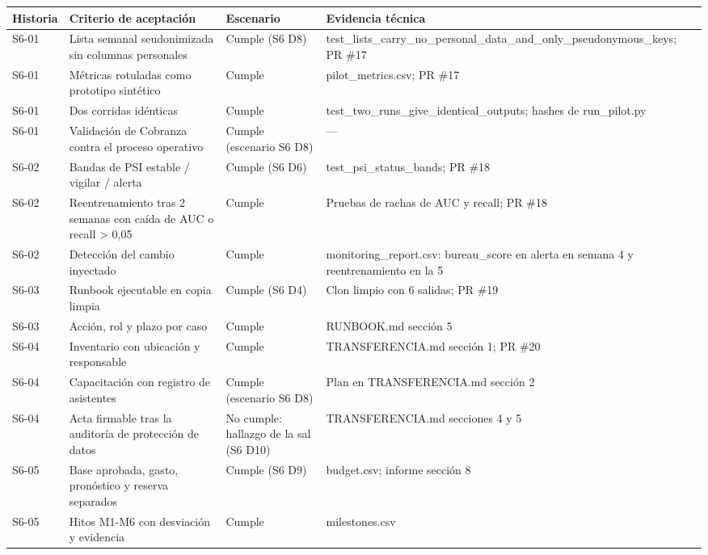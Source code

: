 \scriptsize
\begin{tabularx}{\linewidth}{l X p{3cm} X}
\toprule
\textbf{Historia} & \textbf{Criterio de aceptación} & \textbf{Escenario} & \textbf{Evidencia técnica} \\
\midrule
S6-01 & Lista semanal seudonimizada sin columnas personales & Cumple (S6 D8) & test\_\allowbreak{}lists\_\allowbreak{}carry\_\allowbreak{}no\_\allowbreak{}personal\_\allowbreak{}data\_\allowbreak{}and\_\allowbreak{}only\_\allowbreak{}pseudonymous\_\allowbreak{}keys; PR \#17 \\
S6-01 & Métricas rotuladas como prototipo sintético & Cumple & pilot\_\allowbreak{}metrics.csv; PR \#17 \\
S6-01 & Dos corridas idénticas & Cumple & test\_\allowbreak{}two\_\allowbreak{}runs\_\allowbreak{}give\_\allowbreak{}identical\_\allowbreak{}outputs; hashes de run\_\allowbreak{}pilot.py \\
S6-01 & Validación de Cobranza contra el proceso operativo & Cumple (escenario S6 D8) & — \\
S6-02 & Bandas de PSI estable / vigilar / alerta & Cumple (S6 D6) & test\_\allowbreak{}psi\_\allowbreak{}status\_\allowbreak{}bands; PR \#18 \\
S6-02 & Reentrenamiento tras 2 semanas con caída de AUC o recall > 0,05 & Cumple & Pruebas de rachas de AUC y recall; PR \#18 \\
S6-02 & Detección del cambio inyectado & Cumple & monitoring\_\allowbreak{}report.csv: bureau\_\allowbreak{}score en alerta en semana 4 y reentrenamiento en la 5 \\
S6-03 & Runbook ejecutable en copia limpia & Cumple (S6 D4) & Clon limpio con 6 salidas; PR \#19 \\
S6-03 & Acción, rol y plazo por caso & Cumple & RUNBOOK.md sección 5 \\
S6-04 & Inventario con ubicación y responsable & Cumple & TRANSFERENCIA.md sección 1; PR \#20 \\
S6-04 & Capacitación con registro de asistentes & Cumple (escenario S6 D8) & Plan en TRANSFERENCIA.md sección 2 \\
S6-04 & Acta firmable tras la auditoría de protección de datos & No cumple: hallazgo de la sal (S6 D10) & TRANSFERENCIA.md secciones 4 y 5 \\
S6-05 & Base aprobada, gasto, pronóstico y reserva separados & Cumple (S6 D9) & budget.csv; informe sección 8 \\
S6-05 & Hitos M1-M6 con desviación y evidencia & Cumple & milestones.csv \\
\bottomrule
\end{tabularx}
